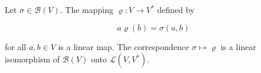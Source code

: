 Let $\sigma \in \mathcal{B}(V)$. The mapping $\varrho: V \to V^*$ defined by

$$a\varrho(b) = \sigma(a, b)$$

for all $a, b \in V$ is a linear map. The correspondence $\sigma \mapsto \varrho$ is a linear isomorphism of $\mathcal{B}(V)$ onto $\mathcal{L}(V, V^*)$.
